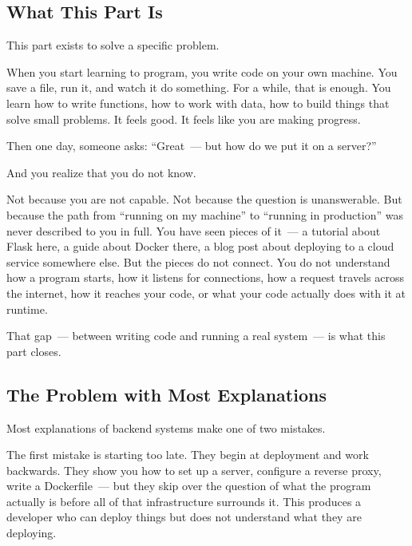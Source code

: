 \label{ch:part4-introduction}

\chapterrule

\label{part4-introduction:about-this-part}

\subsection*{What This Part Is}\label{part4-introduction:what-this-part-is}

This part exists to solve a specific problem.

When you start learning to program, you write code on your own machine. You save a file, run it, and watch it do something. For a while, that is enough. You learn how to write functions, how to work with data, how to build things that solve small problems. It feels good. It feels like you are making progress.

Then one day, someone asks: ``Great~--- but how do we put it on a server?''

And you realize that you do not know.

Not because you are not capable. Not because the question is unanswerable. But because the path from ``running on my machine'' to ``running in production'' was never described to you in full. You have seen pieces of it~--- a tutorial about Flask here, a guide about Docker there, a blog post about deploying to a cloud service somewhere else. But the pieces do not connect. You do not understand how a program starts, how it listens for connections, how a request travels across the internet, how it reaches your code, or what your code actually does with it at runtime.

That gap~--- between writing code and running a real system~--- is what this part closes.

\subsection*{The Problem with Most Explanations}\label{part4-introduction:the-problem-with-most-explanations}

Most explanations of backend systems make one of two mistakes.

The first mistake is starting too late. They begin at deployment and work backwards. They show you how to set up a server, configure a reverse proxy, write a Dockerfile~--- but they skip over the question of what the program actually is before all of that infrastructure surrounds it. This produces a developer who can deploy things but does not understand what they are deploying.

